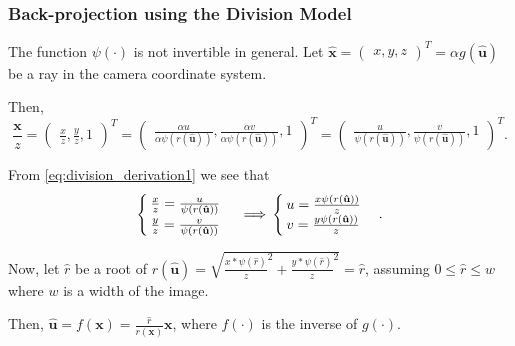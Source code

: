 \documentclass[
  twocolumn,
]{article} %
\begin{document}
\subsubsection{Back-projection using the Division Model}\label{subsub:back_projection_using_the_division_model}

The function \(\psi(\cdot)\) is not invertible in general.
Let \(\mathbf{\hat{x}} = \begin{pmatrix}
	x, y, z
\end{pmatrix}^{T} = \alpha g(\mathbf{\hat{u}})\) be a ray in the camera coordinate system.

Then,
\begin{equation} \label{eq:division_derivation1}
	\frac{\mathbf{x}}{z}  =
	\begin{pmatrix}
		\frac{x}{z}, \frac{y}{z}, 1
	\end{pmatrix}^{T}                                                                      =
	\begin{pmatrix}
		\frac{\alpha u}{\alpha \psi(r(\mathbf{\hat{u}}))},
		\frac{\alpha v}{\alpha \psi(r(\mathbf{\hat{u}}))},
		1
	\end{pmatrix}^{T} =
	\begin{pmatrix}
		\frac{u}{\psi(r(\mathbf{\hat{u}}))},
		\frac{v}{\psi(r(\mathbf{\hat{u}}))},
		1
	\end{pmatrix}^{T}.
\end{equation}

From \ref{eq:division_derivation1} we see that
\begin{equation} \label{eq:division_derivation2}
	\begin{cases}
		\frac{x}{z} = \frac{u}{\psi(r(\mathbf{\hat{u}}))} \\
		\frac{y}{z} = \frac{v}{\psi(r(\mathbf{\hat{u}}))}
	\end{cases} \implies \\
	\begin{cases}
		u = \frac{x \psi(r(\mathbf{\hat{u}}))}{z} \\
		v = \frac{y \psi(r(\mathbf{\hat{u}}))}{z}
	\end{cases}.
\end{equation}

Now, let \(\hat{r}\) be a root of
\(r(\mathbf{\hat{u}})
= \sqrt{
	\frac{x * \psi \left( \hat{r}\right)}{z}^{2} +
	\frac{y * \psi \left( \hat{r}\right)}{z}^{2}
} = \hat{r}\), assuming \(0 \leq \hat{r} \leq w\) where \(w\) is a width of
the image.

Then, \(\mathbf{\hat{u}} = f(\mathbf{x}) =
\frac{\hat{r}}{r(\mathbf{x})}\mathbf{x}\),
where \(f(\cdot)\) is the inverse of \(g(\cdot)\).
\end{document}
